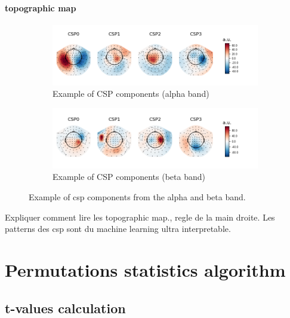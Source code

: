 \paragraph{topographic map}

\begin{figure}
    \centering
    \begin{subfigure}[b]{0.55\textwidth}
       \includegraphics[width=1\linewidth]{images_report/sensor/csp_individual/sub_155_alpha.png}
       \caption{Example of CSP components (alpha band)}
       \label{fig:csp_component_alpha_band}
    \end{subfigure}
    
    \begin{subfigure}[b]{0.55\textwidth}
       \includegraphics[width=1\linewidth]{images_report/sensor/csp_individual/sub_215_beta.png}
       \caption{Example of CSP components (beta band)}
       \label{fig:csp_component_beta_band}
    \end{subfigure}

    \caption[Example of csp components from the alpha and beta band.]%
    {Example of csp components from the alpha and beta band.}
    \label{example_csp_component}
\end{figure}

Expliquer comment lire les topographic map., regle de la main droite.
Les patterns des csp sont du machine learning ultra interpretable.


\section{Permutations statistics algorithm}

\subsection{t-values calculation}

